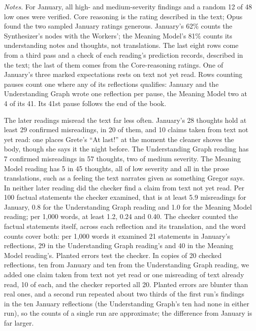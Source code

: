 \documentclass[11pt]{article}
\begin{document}
\begin{table}[htbp]
    \vspace{0.5em}
    \begin{minipage}{0.94\linewidth}
    \footnotesize
    \emph{Notes.} For January, all high- and medium-severity findings and a
    random 12 of 48 low ones were verified. Core reasoning is the rating
    described in the text; Opus found the two sampled January ratings generous.
    January's 62\% counts the Synthesizer's nodes with the Workers'; the Meaning
    Model's 81\% counts its understanding notes and thoughts, not translations.
    The last eight rows come from a third pass and a check of each reading's
    prediction records, described in the text; the last of them comes from the
    Core-reasoning ratings. One of January's three marked expectations rests on
    text not yet read. Rows counting pauses count one where any of its
    reflections qualifies: January and the Understanding Graph wrote one
    reflection per pause, the Meaning Model two at 4 of its 41. Its 41st pause
    follows the end of the book.
    \end{minipage}
\end{table}

The later readings misread the text far less often. January's 28 thoughts
hold at least 29 confirmed misreadings, in 20 of them, and 10 claims taken from
text not yet read: one places Grete's ``At last!'' at the moment the cleaner
shoves the body, though she says it the night before. The Understanding Graph
reading has 7 confirmed misreadings in 57 thoughts, two of medium severity. The
Meaning Model reading has 5 in 45 thoughts, all of low severity and all in the
prose translations, such as a feeling the text narrates given as something
Gregor says. In neither later reading did the checker find a claim from text not yet read. Per 100 factual statements the
checker examined, that is at least 5.9 misreadings for January, 0.8 for the
Understanding Graph reading and 1.0 for the Meaning Model reading; per 1,000
words, at least 1.2, 0.24 and 0.40. The checker counted the factual statements
itself, across each reflection and its translation, and the word counts cover
both: per 1,000 words it examined 21 statements in January's reflections, 29 in
the Understanding Graph reading's and 40 in the Meaning Model reading's.
Planted errors test the checker. In copies of 20 checked reflections, ten from
January and ten from the Understanding Graph reading, we added one claim taken
from text not yet read or one misreading of text already read, 10 of each, and
the checker reported all 20. Planted errors are blunter than real ones, and a
second run repeated about two thirds of the first run's findings in the ten
January reflections (the Understanding Graph's ten had none in either run), so
the counts of a single run are approximate; the difference from January is far
larger.
\end{document}
